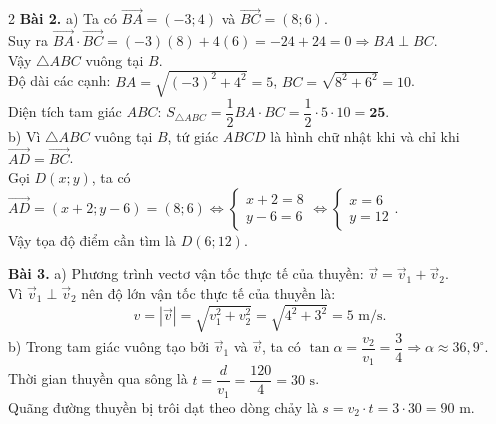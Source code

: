 \documentclass[10pt,a4paper]{article}
\begin{document}
\begin{multicols}{2}
\textbf{Bài 2.}
a) Ta có $\vec{BA} = (-3; 4)$ và $\vec{BC} = (8; 6)$.\\
Suy ra $\vec{BA} \cdot \vec{BC} = (-3)(8) + 4(6) = -24 + 24 = 0 \Rightarrow BA \perp BC$.\\
Vậy $\triangle ABC$ vuông tại $B$.\\
Độ dài các cạnh: $BA = \sqrt{(-3)^2 + 4^2} = 5$, $BC = \sqrt{8^2 + 6^2} = 10$.\\
Diện tích tam giác $ABC$: $S_{\triangle ABC} = \dfrac{1}{2} BA \cdot BC = \dfrac{1}{2} \cdot 5 \cdot 10 = \mathbf{25}$.\\
b) Vì $\triangle ABC$ vuông tại $B$, tứ giác $ABCD$ là hình chữ nhật khi và chỉ khi $\vec{AD} = \vec{BC}$.\\
Gọi $D(x; y)$, ta có $\vec{AD} = (x + 2; y - 6) = (8; 6) \Leftrightarrow \begin{cases} x + 2 = 8 \\ y - 6 = 6 \end{cases} \Leftrightarrow \begin{cases} x = 6 \\ y = 12 \end{cases}$.\\
Vậy tọa độ điểm cần tìm là $D(6; 12)$.

\textbf{Bài 3.}
a) Phương trình vectơ vận tốc thực tế của thuyền: $\vec{v} = \vec{v}_1 + \vec{v}_2$.\\
Vì $\vec{v}_1 \perp \vec{v}_2$ nên độ lớn vận tốc thực tế của thuyền là:
$$v = |\vec{v}| = \sqrt{v_1^2 + v_2^2} = \sqrt{4^2 + 3^2} = 5\text{ m/s}.$$
b) Trong tam giác vuông tạo bởi $\vec{v}_1$ và $\vec{v}$, ta có $\tan\alpha = \dfrac{v_2}{v_1} = \dfrac{3}{4} \Rightarrow \alpha \approx 36{,}9^\circ$.\\
Thời gian thuyền qua sông là $t = \dfrac{d}{v_1} = \dfrac{120}{4} = 30\text{ s}$.\\
Quãng đường thuyền bị trôi dạt theo dòng chảy là $s = v_2 \cdot t = 3 \cdot 30 = 90\text{ m}$.

\end{multicols}
\end{document}
